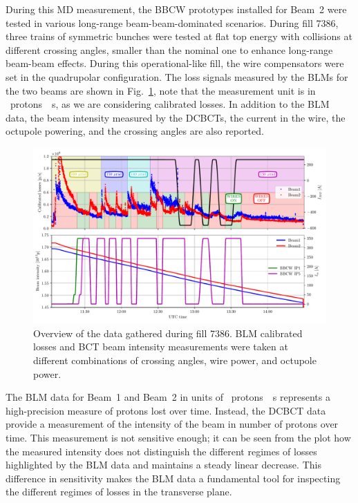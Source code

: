 During this MD measurement, the BBCW prototypes installed for Beam~2 were tested in various long-range beam-beam-dominated scenarios. During fill 7386, three trains of symmetric bunches were tested at flat top energy with collisions at different crossing angles, smaller than the nominal one to enhance long-range beam-beam effects. During this operational-like fill, the wire compensators were set in the quadrupolar configuration. The loss signals measured by the BLMs for the two beams are shown in Fig.~\ref{fig:wire-data}, note that the measurement unit is in \SI{}{protons \per s}, as we are considering calibrated losses. In addition to the BLM data, the beam intensity measured by the DCBCTs, the current in the wire, the octupole powering, and the crossing angles are also reported. 

\begin{figure}[hpt]
    \centering
    \includegraphics[width=1.0\textwidth]{5_wire_compensators_LHC/figs/wire_summary.pdf}
    \caption{Overview of the data gathered during fill 7386. BLM calibrated losses and BCT beam intensity measurements were taken at different combinations of crossing angles, wire power, and octupole power.}
    \label{fig:wire-data}
\end{figure}

The BLM data for Beam~1 and Beam~2 in units of \SI{}{protons \per s} represents a high-precision measure of protons lost over time. Instead, the DCBCT data provide a measurement of the intensity of the beam in number of protons over time. This measurement is not sensitive enough; it can be seen from the plot how the measured intensity does not distinguish the different regimes of losses highlighted by the BLM data and maintains a steady linear decrease. This difference in sensitivity makes the BLM data a fundamental tool for inspecting the different regimes of losses in the transverse plane.  

